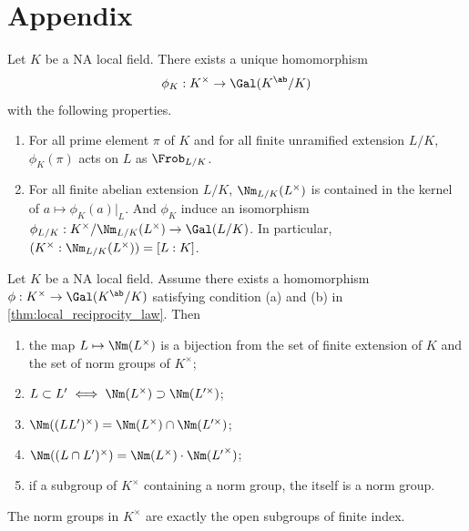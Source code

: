 \section{Appendix}

  \begin{theorem}\label{thm:local_reciprocity_law}
      Let $K$ be a NA local field.
      There exists a unique homomorphism
      \[ \phi_K : K^\times \to \Gal(K^\ab/ K) \]
      with the following properties.
      \begin{enumerate}
          \item For all prime element $\pi$ of $K$ and for all finite unramified extension $L/K$, $\phi_K(\pi)$ acts on $L$ as $\Frob_{L/K}$.
          \item For all finite abelian extension $L/K$, $\Nm_{L/K}(L^\times)$ is contained in the kernel of $a \mapsto \phi_K(a)|_L$.
          And $\phi_K$ induce an isomorphism $\phi_{L/K}: K^\times/\Nm_{L/K}(L^\times) \to \Gal(L/K)$.
          In particular, $(K^\times : \Nm_{L/K}(L^\times)) = [L:K]$.
      \end{enumerate}
  \end{theorem}

  \begin{corollary}\label{cor:correspondence_between_extensions_and_norm_groups}
      Let $K$ be a NA local field.
      Assume there exists a homomorphism $\phi: K^\times \to \Gal(K^\ab / K)$ satisfying condition (a) and (b) in \cref{thm:local_reciprocity_law}.
      Then
      \begin{enumerate}
          \item the map $L \mapsto \Nm(L^\times)$ is a bijection from the set of finite extension of $K$ and the set of norm groups of $K^\times$;
          \item $L \subset L' \iff \Nm(L^\times) \supset \Nm(L'^\times)$;
          \item $\Nm((LL')^\times) = \Nm(L^\times) \cap \Nm(L'^\times)$;
          \item $\Nm((L \cap L')^\times) = \Nm (L^\times) \cdot \Nm ({L'}^\times)$;
          \item if a subgroup of $K^\times$ containing a norm group, the itself is a norm group.
      \end{enumerate}
  \end{corollary}

    \begin{theorem}\label{thm:norm_groups_are_exactly_open_subgroups_of_finite_index}
    The norm groups in $K^\times$ are exactly the open subgroups of finite index.
  \end{theorem}